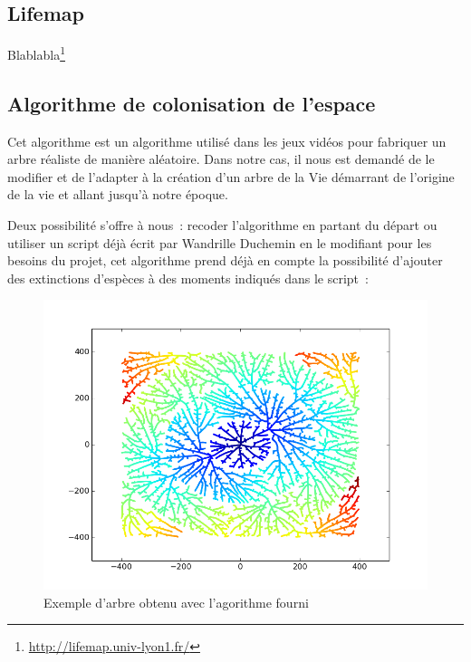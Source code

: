 \documentclass[a4paper]{article}
\begin{document}
	\subsection{Lifemap}
		Blablabla\footnote{\url{http://lifemap.univ-lyon1.fr/}}

	\subsection{Algorithme de colonisation de l'espace}
		Cet algorithme est un algorithme utilisé dans les jeux vidéos pour fabriquer un arbre réaliste de manière aléatoire. Dans notre cas, il nous est demandé de le modifier et de l’adapter à la création d’un arbre de la Vie démarrant  de l’origine de la vie et allant jusqu’à notre époque.
	
		Deux possibilité s’offre à nous :  recoder l’algorithme en partant du départ ou utiliser un script déjà écrit par Wandrille Duchemin en le modifiant pour les besoins du projet, cet algorithme prend déjà en compte la possibilité d’ajouter des extinctions d’espèces à des moments indiqués dans le script :
		\begin{figure}[!h]
			\centering
			\includegraphics[width=12cm]{./img/multipleExtinction.png}
			\caption{Exemple d'arbre obtenu avec l'agorithme fourni}
		\end{figure}
	
\end{document}
